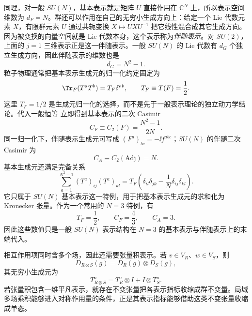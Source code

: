 同理，对一般 $SU(N)$，基本表示就是矩阵 $U$ 直接作用在 $\mathbb C^N$ 上，所以表示空间维数为 $d_F=N$。群还可以作用在自己的无穷小生成方向上：给定一个 Lie 代数元素 $X$，有限群元素 $U$ 通过共轭变换 $X\mapsto UXU^{-1}$ 把它线性混合成其它生成方向。因为被变换的向量空间就是 Lie 代数本身，这个表示称为\emph{伴随表示}。对 $SU(2)$，上面的 $j=1$ 三维表示正是这一伴随表示。一般 $SU(N)$ 的 Lie 代数有 $d_G$ 个独立生成方向，因此伴随表示的维数也是
\begin{equation*}
 d_G=N^2-1.
\end{equation*}
粒子物理通常把基本表示生成元的归一化约定固定为
\begin{equation}
 \Tr_F(T^aT^b)=T_F\delta^{ab},
 \qquad {T_F\equiv T(F)=\frac12.}
 \label{eq:generator-trace-normalization-dp11}
\end{equation}
这里 $T_F=1/2$ 是生成元归一化的选择，而不是先于一般表示理论的独立动力学结论。代入一般恒等 立即得到基本表示的二次 Casimir
\begin{equation}
 {C_F\equiv C_2(F)=\frac{N^2-1}{2N}.}
 \label{eq:cf-general-math-dp11}
\end{equation}
同一归一化下，伴随表示生成元可写成 $(F^a)_{bc}=-\ii f^{abc}$；$SU(N)$ 的伴随二次 Casimir 为
\begin{equation}
 {C_A\equiv C_2(\mathrm{Adj})=N.}
 \label{eq:ca-general-math-dp11}
\end{equation}
基本生成元还满足完备关系
\begin{equation}
 {
 \sum_{a=1}^{N^2-1}(T^a)_{ij}(T^a)_{kl}
 =T_F\left(\delta_{il}\delta_{jk}-\frac1N\delta_{ij}\delta_{kl}\right).}
 \label{eq:suN-fierz-math-dp68}
\end{equation}
它只属于 $SU(N)$ 基本表示这一特例，用于把基本表示生成元的求和化为 Kronecker 张量。作为一个常用的 $N=3$ 特例，有
\begin{equation*}
 T_F=\frac12,\qquad C_F=\frac43,\qquad C_A=3.
\end{equation*}
因此这些数值只是一般 $SU(N)$ 表示结构在 $N=3$ 的基本表示与伴随表示上的末端代入。

相互作用项同时含多个场，因此还需要张量积表示。若 $v\in V_R$、$w\in V_S$，则
\begin{equation}
 D_{R\otimes S}(g)=D_R(g)\otimes D_S(g),
 \label{eq:tensor-product-rep-dp11}
\end{equation}
其无穷小生成元为
\begin{equation}
 {
 T_{R\otimes S}^a
 =T_R^a\otimes I+I\otimes T_S^a.}
 \label{eq:tensor-product-generator-dp11}
\end{equation}
若张量积包含一维平凡表示，就存在不变张量把各表示指标收缩成群不变量。局域多场乘积能够进入对称作用量的条件，正是其表示指标能够借助这类不变张量收缩成单态。

